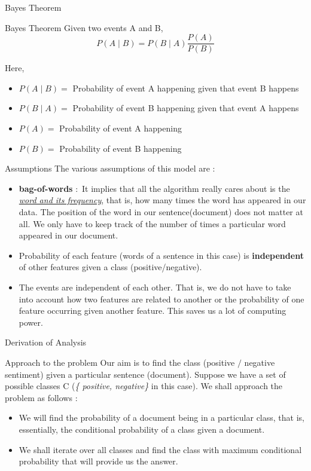 \documentclass[usenames,dvipsnames]{beamer}
\begin{document}
\begin{frame}{Bayes Theorem}
	\begin{block}{Bayes Theorem}
		Given two events A and B, 
\begin{equation}
	P (A \mid B) = P(B \mid A) \frac{P(A)}{P(B)}
\end{equation}
	\end{block}
	Here, \\
	\begin{itemize}
	\item $P (A \mid B) = $ Probability of event A happening given that event B happens 
	\item $P (B \mid A) = $ Probability of event B happening given that event A happens 
	\item $P(A) = $ Probability of event A happening 
	\item $P(B) = $ Probability of event B happening 
	\end{itemize}
\end{frame}
\begin{frame}{Assumptions}
	The various assumptions of this model are $\colon$ \\
	\begin{itemize}
		\item \textbf{bag-of-words} $\colon$ It implies that all the algorithm really cares about is the \underline{\textit{word and its frequency}}, that is, how many times the word has appeared in our data. The position of the word in our sentence(document) does not matter at all. We only have to keep track of the number of times a particular word appeared in our document.
		\item Probability of each feature (words of a sentence in this case) is \textbf{independent} of other features given a class (positive/negative).
		\item The events are independent of each other. That is, we do not have to take into account how two features are related to another or the probability of one feature occurring given another feature. This saves us a lot of computing power.
	\end{itemize}
\end{frame}
\begin{frame}{Derivation of Analysis}
	\begin{block}{Approach to the problem}
	Our aim is to find the class (positive $/$ negative sentiment) given a particular sentence (document). Suppose we have a set of possible classes C (\textit{\{ positive, negative\}} in this case). We shall approach the problem as follows $\colon$
	\begin{itemize}
		\item We will find the probability of a document being in a particular class, that is, essentially, the conditional probability of a class given a document.
		\item We shall iterate over all classes and find the class with maximum conditional probability that will provide us the answer. 
	\end{itemize}
\end{block}
\end{frame}
\end{document}
